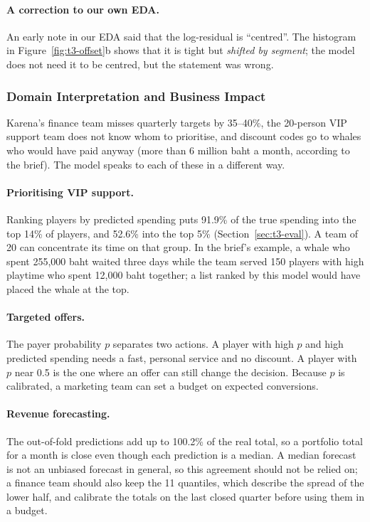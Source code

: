 \documentclass[../main.tex]{subfiles}
\begin{document}
\paragraph{A correction to our own EDA.} An early note in our EDA said that the log-residual is ``centred''. The histogram in Figure~\ref{fig:t3-offset}b shows that it is tight but \emph{shifted by segment}; the model does not need it to be centred, but the statement was wrong.

\subsubsection{Domain Interpretation and Business Impact}

Karena's finance team misses quarterly targets by 35--40\%, the 20-person VIP support team does not know whom to prioritise, and discount codes go to whales who would have paid anyway (more than 6 million baht a month, according to the brief). The model speaks to each of these in a different way.

\paragraph{Prioritising VIP support.} Ranking players by predicted spending puts 91.9\% of the true spending into the top 14\% of players, and 52.6\% into the top 5\% (Section~\ref{sec:t3-eval}). A team of 20 can concentrate its time on that group. In the brief's example, a whale who spent 255{,}000 baht waited three days while the team served 150 players with high playtime who spent 12{,}000 baht together; a list ranked by this model would have placed the whale at the top.

\paragraph{Targeted offers.} The payer probability $p$ separates two actions. A player with high $p$ and high predicted spending needs a fast, personal service and no discount. A player with $p$ near 0.5 is the one where an offer can still change the decision. Because $p$ is calibrated, a marketing team can set a budget on expected conversions.

\paragraph{Revenue forecasting.} The out-of-fold predictions add up to 100.2\% of the real total, so a portfolio total for a month is close even though each prediction is a median. A median forecast is not an unbiased forecast in general, so this agreement should not be relied on; a finance team should also keep the 11 quantiles, which describe the spread of the lower half, and calibrate the totals on the last closed quarter before using them in a budget.
\end{document}
